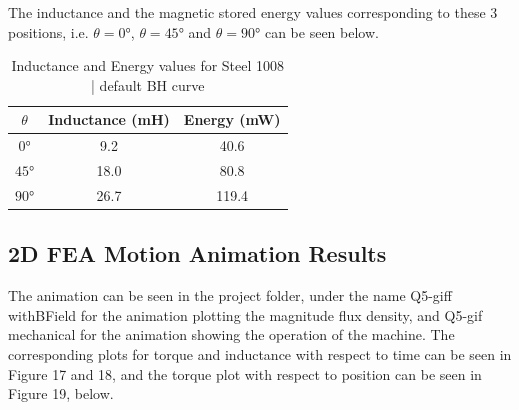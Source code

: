 \documentclass[a4paper, 11pt]{article}
\begin{document}
The inductance and the magnetic stored energy values corresponding to these 3 positions, i.e. $\theta=\ang{0}$, $\theta=\ang{45}$ and $\theta=\ang{90}$ can be seen below.

\begin{table}[htbp]
	\begin{center}
		\begin{tabular}{|c|c|c}
		$\theta$ & Inductance (mH) & Energy (mW)\\
		\hline
		$\ang{0}$ & 9.2 & 40.6\\
		$\ang{45}$ & 18.0 & 80.8\\
		$\ang{90}$ & 26.7 & 119.4\\
		\end{tabular}
	\end{center}
	\caption{Inductance and Energy values for Steel 1008 | default BH curve}
\end{table}


\subsection{2D FEA Motion Animation Results}
The animation can be seen in the project folder, under the name Q5-giff withBField for the animation plotting the magnitude flux density, and Q5-gif mechanical for the animation showing the operation of the machine. The corresponding plots for torque and inductance with respect to time can be seen in Figure 17 and 18, and the torque plot with respect to position can be seen in Figure 19, below.
\end{document}
